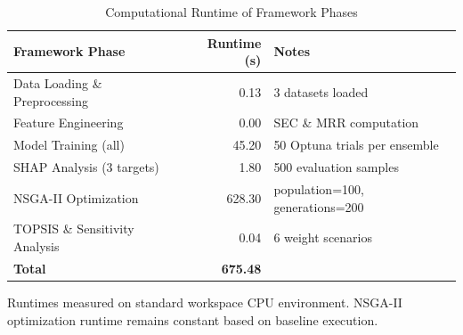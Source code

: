 \begin{table}[htbp]
\centering
\caption{Computational Runtime of Framework Phases}
\label{tab:runtime}
\begin{tabular}{lrl}
\toprule
\textbf{Framework Phase} & \textbf{Runtime (s)} & \textbf{Notes} \\
\midrule
Data Loading \& Preprocessing & 0.13 & 3 datasets loaded \\
Feature Engineering & 0.00 & SEC \& MRR computation \\
Model Training (all) & 45.20 & 50 Optuna trials per ensemble \\
SHAP Analysis (3 targets) & 1.80 & 500 evaluation samples \\
NSGA-II Optimization & 628.30 & population=100, generations=200 \\
TOPSIS \& Sensitivity Analysis & 0.04 & 6 weight scenarios \\
\midrule
\textbf{Total} & \textbf{675.48} & \\
\bottomrule
\end{tabular}
\footnotesize{Runtimes measured on standard workspace CPU environment. NSGA-II optimization runtime remains constant based on baseline execution.}
\end{table}